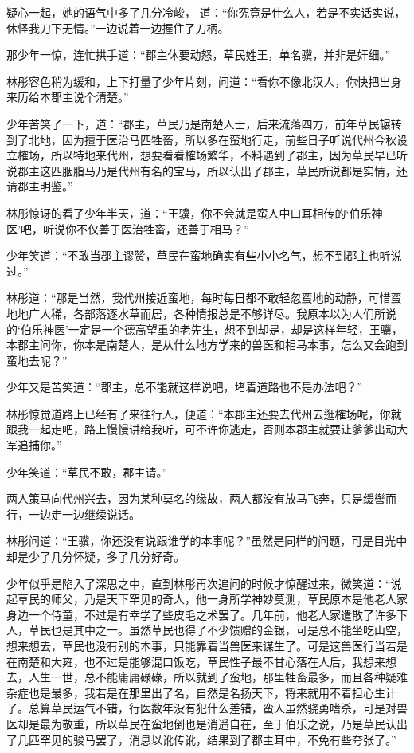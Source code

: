 疑心一起，她的语气中多了几分冷峻， 道：“你究竟是什么人，若是不实话实说，休怪我刀下无情。”一边说着一边握住了刀柄。

那少年一惊，连忙拱手道：“郡主休要动怒，草民姓王，单名骥，并非是奸细。”

林彤容色稍为缓和，上下打量了少年片刻，问道：“看你不像北汉人，你快把出身来历给本郡主说个清楚。”

少年苦笑了一下，道：“郡主，草民乃是南楚人士，后来流落四方，前年草民辗转到了北地，因为擅于医治马匹牲畜，所以多在蛮地行走，前些日子听说代州今秋设立榷场，所以特地来代州，想要看看榷场繁华，不料遇到了郡主，因为草民早已听说郡主这匹胭脂马乃是代州有名的宝马，所以认出了郡主，草民所说都是实情，还请郡主明鉴。”

林彤惊讶的看了少年半天，道：“王骥，你不会就是蛮人中口耳相传的‘伯乐神医’吧，听说你不仅善于医治牲畜，还善于相马？”

少年笑道：“不敢当郡主谬赞，草民在蛮地确实有些小小名气，想不到郡主也听说过。”

林彤道：“那是当然，我代州接近蛮地，每时每日都不敢轻忽蛮地的动静，可惜蛮地地广人稀，各部落逐水草而居，各种情报总是不够详尽。我原本以为人们所说的‘伯乐神医’一定是一个德高望重的老先生，想不到却是，却是这样年轻，王骥，本郡主问你，你本是南楚人，是从什么地方学来的兽医和相马本事，怎么又会跑到蛮地去呢？”

少年又是苦笑道：“郡主，总不能就这样说吧，堵着道路也不是办法吧？”

林彤惊觉道路上已经有了来往行人，便道：“本郡主还要去代州去逛榷场呢，你就跟我一起走吧，路上慢慢讲给我听，可不许你逃走，否则本郡主就要让爹爹出动大军追捕你。”

少年笑道：“草民不敢，郡主请。”

两人策马向代州兴去，因为某种莫名的缘故，两人都没有放马飞奔，只是缓辔而行，一边走一边继续说话。

林彤问道：“王骥，你还没有说跟谁学的本事呢？”虽然是同样的问题，可是目光中却是少了几分怀疑，多了几分好奇。

少年似乎是陷入了深思之中，直到林彤再次追问的时候才惊醒过来，微笑道：“说起草民的师父，乃是天下罕见的奇人，他一身所学神妙莫测，草民原本是他老人家身边一个侍童，不过是有幸学了些皮毛之术罢了。几年前，他老人家遣散了许多下人，草民也是其中之一。虽然草民也得了不少馈赠的金银，可是总不能坐吃山空，想来想去，草民也没有别的本事，只能靠着当兽医来谋生了。可是这兽医行当若是在南楚和大雍，也不过是能够混口饭吃，草民性子最不甘心落在人后，我想来想去，人生一世，总不能庸庸碌碌，所以就到了蛮地，那里牲畜最多，而且各种疑难杂症也是最多，我若是在那里出了名，自然是名扬天下，将来就用不着担心生计了。总算草民运气不错，行医数年没有犯什么差错，蛮人虽然骁勇嗜杀，可是对兽医却是最为敬重，所以草民在蛮地倒也是消遥自在，至于伯乐之说，乃是草民认出了几匹罕见的骏马罢了，消息以讹传讹，结果到了郡主耳中，不免有些夸张了。”

